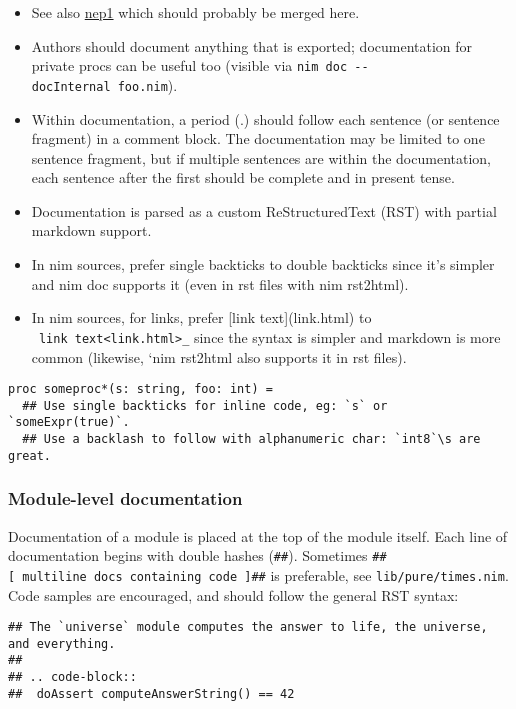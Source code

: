 \begin{itemize}
\tightlist
\item
  See also \href{https://nim-lang.github.io/Nim/nep1.html}{nep1} which
  should probably be merged here.
\item
  Authors should document anything that is exported; documentation for
  private procs can be useful too (visible via
  \texttt{nim\ doc\ -\/-docInternal\ foo.nim}).
\item
  Within documentation, a period ({.}) should follow each sentence (or
  sentence fragment) in a comment block. The documentation may be
  limited to one sentence fragment, but if multiple sentences are within
  the documentation, each sentence after the first should be complete
  and in present tense.
\item
  Documentation is parsed as a custom ReStructuredText (RST) with
  partial markdown support.
\item
  In nim sources, prefer single backticks to double backticks since it's
  simpler and {nim doc} supports it (even in rst files with {nim
  rst2html}).
\item
  In nim sources, for links, prefer {{[}link text{]}(link.html)} to
  \texttt{\textasciigrave{}\ \textasciigrave{}link\ text\textless{}link.html\textgreater{}\textasciigrave{}\_}{
  since the syntax is simpler and markdown is more common (likewise,
  `nim rst2html} also supports it in rst files).
\end{itemize}

\begin{verbatim}
proc someproc*(s: string, foo: int) =
  ## Use single backticks for inline code, eg: `s` or `someExpr(true)`.
  ## Use a backlash to follow with alphanumeric char: `int8`\s are great.
\end{verbatim}

\hypertarget{module-level-documentation}{%
\subsubsection{Module-level
documentation}\label{module-level-documentation}}

Documentation of a module is placed at the top of the module itself.
Each line of documentation begins with double hashes (\texttt{\#\#}).
Sometimes \texttt{\#\#{[}\ multiline\ docs\ containing\ code\ {]}\#\#}
is preferable, see \texttt{lib/pure/times.nim}. Code samples are
encouraged, and should follow the general RST syntax:

\begin{verbatim}
## The `universe` module computes the answer to life, the universe, and everything.
##
## .. code-block::
##  doAssert computeAnswerString() == 42
\end{verbatim}

